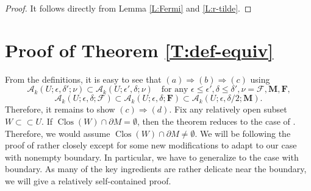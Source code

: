 \documentclass[10pt]{amsart}
\theoremstyle{definition}
\theoremstyle{remark}
\numberwithin{equation}{section}
\newcommand{\F}{\mathcal{F}}
\newcommand{\de}{\delta}
\newcommand{\ep}{\epsilon}
\newcommand{\M}{\mathbf{M}}
\newcommand{\mF}{\mathbf{F}}
\newcommand{\sA}{\mathscr{A}}
\newcommand{\Clos}{\operatorname{Clos}}
\begin{document}
\begin{proof}
It follows directly from Lemma \ref{L:Fermi} and \ref{L:r-tilde}.
\end{proof}



\section{Proof of Theorem \ref{T:def-equiv}}
\label{A}


From the definitions, it is easy to see that $(a) \Longrightarrow (b) \Longrightarrow (c)$ using
\[ \sA_k(U; \ep,\de';\nu) \subset \sA_k(U; \ep',\de;\nu) \quad \text{for any $\ep \leq \ep', \de \leq \de', \nu=\F,\M,\mF$,} \]
\[ \sA_k(U; \ep, \de; \F) \subset \sA_k(U; \ep, \de; \mF)  \subset \sA_k(U; \ep, \de/2; \M).\]
Therefore, it remains to show $(c)\Longrightarrow (d)$. Fix any relatively open subset $W \subset \subset U$. If $\Clos(W) \cap \partial M=\emptyset$, then the theorem reduces to the case of \cite[Theorem 3.9]{Pitts}. Therefore, we would assume $\Clos(W) \cap \partial M \neq \emptyset$. We will be following the proof of \cite[Theorem 3.9]{Pitts} rather closely except for some new modifications to adapt to our case with nonempty boundary. In particular, we have to generalize \cite[Lemma 3.5, Lemma 3.7, Lemma 3.8]{Pitts} to the case with boundary.  As many of the key ingredients are rather delicate near the boundary, we will give a relatively self-contained proof.
\end{document}
